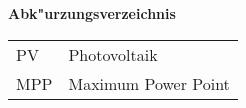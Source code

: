 \addtocounter{table}{-1} 
\bigskip
\Large \textsf{\textbf{Abk"urzungsverzeichnis}}
\begin{longtable}{p{2 cm}p{8 cm}} 
PV & Photovoltaik\\
MPP & Maximum Power Point\\
\end{longtable}